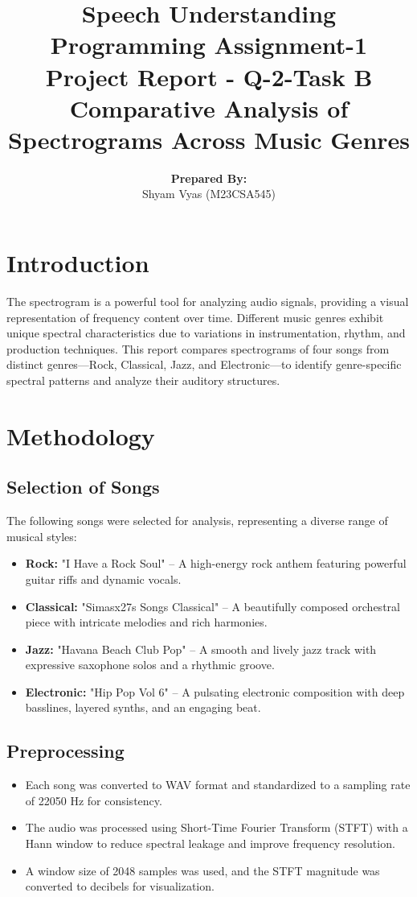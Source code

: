 \documentclass[a4paper,12pt]{article}
\title{\textbf{Speech Understanding}\\
\bigskip
\bigskip
\bigskip
{Programming Assignment-1}\\
\bigskip\bigskip\bigskip
{Project Report - Q-2-Task B} 
\bigskip\bigskip\bigskip\\
    {Comparative Analysis of \\Spectrograms Across Music Genres}
}
\author{\textbf{Prepared By:}\\Shyam Vyas (M23CSA545)}
\begin{document}
\maketitle

\newpage
\tableofcontents
\newpage

\newpage
\section{Introduction}
The spectrogram is a powerful tool for analyzing audio signals, providing a visual representation of frequency content over time. Different music genres exhibit unique spectral characteristics due to variations in instrumentation, rhythm, and production techniques. This report compares spectrograms of four songs from distinct genres—Rock, Classical, Jazz, and Electronic—to identify genre-specific spectral patterns and analyze their auditory structures.
\newpage
\section{Methodology}

\subsection{Selection of Songs}
The following songs were selected for analysis, representing a diverse range of musical styles:
\begin{itemize}
\item \textbf{Rock:} "I Have a Rock Soul" – A high-energy rock anthem featuring powerful guitar riffs and dynamic vocals.
\item \textbf{Classical:} "Simasx27s Songs Classical" – A beautifully composed orchestral piece with intricate melodies and rich harmonies.
\item \textbf{Jazz:} "Havana Beach Club Pop" – A smooth and lively jazz track with expressive saxophone solos and a rhythmic groove.
\item    \textbf{Electronic:} "Hip Pop Vol 6" – A pulsating electronic composition with deep basslines, layered synths, and an engaging beat.
\end{itemize}


\subsection{Preprocessing}
\begin{itemize}
    \item Each song was converted to WAV format and standardized to a sampling rate of 22050 Hz for consistency.
\item The audio was processed using Short-Time Fourier Transform (STFT) with a Hann window to reduce spectral leakage and improve frequency resolution.
\item A window size of 2048 samples was used, and the STFT magnitude was converted to decibels for visualization.
\end{itemize}
\end{document}
